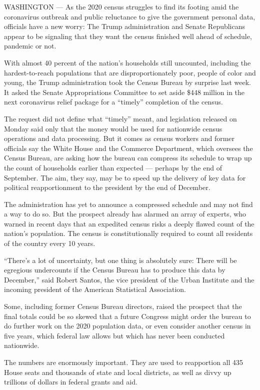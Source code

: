 WASHINGTON --- As the 2020 census struggles to find its footing amid the
coronavirus outbreak and public reluctance to give the government
personal data, officials have a new worry: The Trump administration and
Senate Republicans appear to be signaling that they want the census
finished well ahead of schedule, pandemic or not.

With almost 40 percent of the nation's households still uncounted,
including the hardest-to-reach populations that are disproportionately
poor, people of color and young, the Trump administration took the
Census Bureau by surprise last week. It asked the Senate Appropriations
Committee to set aside \$448 million in the next coronavirus relief
package for a ``timely'' completion of the census.

The request did not define what ``timely'' meant, and legislation
released on Monday said only that the money would be used for nationwide
census operations and data processing. But it comes as census workers
and former officials say the White House and the Commerce Department,
which oversees the Census Bureau, are asking how the bureau can compress
its schedule to wrap up the count of households earlier than expected
--- perhaps by the end of September. The aim, they say, may be to speed
up the delivery of key data for political reapportionment to the
president by the end of December.

The administration has yet to announce a compressed schedule and may not
find a way to do so. But the prospect already has alarmed an array of
experts, who warned in recent days that an expedited census risks a
deeply flawed count of the nation's population. The census is
constitutionally required to count all residents of the country every 10
years.

``There's a lot of uncertainty, but one thing is absolutely sure: There
will be egregious undercounts if the Census Bureau has to produce this
data by December,'' said Robert Santos, the vice president of the Urban
Institute and the incoming president of the American Statistical
Association.

Some, including former Census Bureau directors, raised the prospect that
the final totals could be so skewed that a future Congress might order
the bureau to do further work on the 2020 population data, or even
consider another census in five years, which federal law allows but
which has never been conducted nationwide.

The numbers are enormously important. They are used to reapportion all
435 House seats and thousands of state and local districts, as well as
divvy up trillions of dollars in federal grants and aid.

